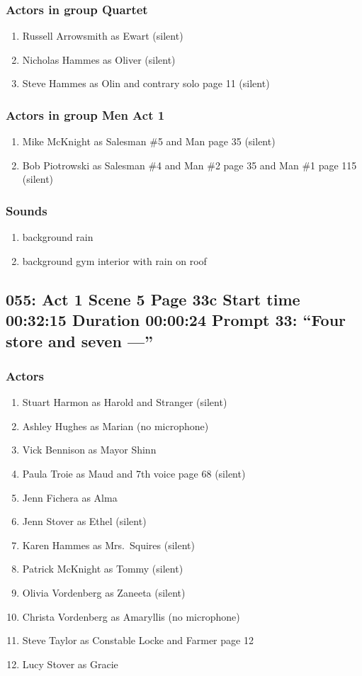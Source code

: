 \subsubsection{Actors in group Quartet}
\begin{enumerate}
\item Russell Arrowsmith as Ewart (silent)
\item Nicholas Hammes as Oliver (silent)
\item Steve Hammes as Olin and contrary solo page 11 (silent)
\end{enumerate}
\subsubsection{Actors in group Men Act 1}
\begin{enumerate}
\item Mike McKnight as Salesman \#5 and Man page 35 (silent)
\item Bob Piotrowski as Salesman \#4 and Man \#2 page 35 and Man \#1 page 115 (silent)
\end{enumerate}

\subsubsection{Sounds}
\begin{enumerate}
\item background rain
\item background gym interior with rain on roof
\end{enumerate}
\subsection{055: Act 1 Scene 5 Page 33c Start time 00:32:15 Duration 00:00:24 Prompt 33: ``Four store and seven ---''}

\subsubsection{Actors}
\begin{enumerate}
\item Stuart Harmon as Harold and Stranger (silent)
\item Ashley Hughes as Marian (no microphone)
\item Vick Bennison as Mayor Shinn
\item Paula Troie as Maud and 7th voice page 68 (silent)
\item Jenn Fichera as Alma
\item Jenn Stover as Ethel (silent)
\item Karen Hammes as Mrs.~Squires (silent)
\item Patrick McKnight as Tommy (silent)
\item Olivia Vordenberg as Zaneeta (silent)
\item Christa Vordenberg as Amaryllis (no microphone)
\item Steve Taylor as Constable Locke and Farmer page 12
\item Lucy Stover as Gracie
\end{enumerate}
